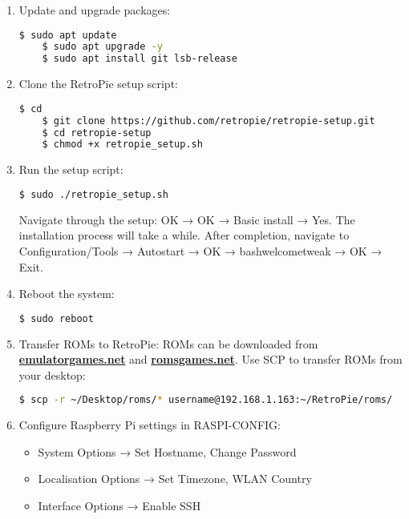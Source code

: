 \documentclass[a4paper,12pt]{article}
\begin{document}
\begin{enumerate}
    \item Update and upgrade packages:
    \begin{lstlisting}[language=bash, breaklines=true, breakatwhitespace=true, columns=fullflexible]
    $ sudo apt update
    $ sudo apt upgrade -y
    $ sudo apt install git lsb-release
    \end{lstlisting}

   \item Clone the RetroPie setup script:
    \begin{lstlisting}[language=bash, breaklines=true, breakatwhitespace=true, columns=fullflexible]
    $ cd
    $ git clone https://github.com/retropie/retropie-setup.git
    $ cd retropie-setup
    $ chmod +x retropie_setup.sh
    \end{lstlisting}

    \item Run the setup script:
    \begin{lstlisting}[language=bash, breaklines=true, breakatwhitespace=true, columns=fullflexible]
    $ sudo ./retropie_setup.sh
    \end{lstlisting}
    Navigate through the setup: OK → OK → Basic install → Yes. The installation process will take a while. After completion, navigate to Configuration/Tools → Autostart → OK → bashwelcometweak → OK → Exit.

    \item Reboot the system:
    \begin{lstlisting}[language=bash, breaklines=true, breakatwhitespace=true, columns=fullflexible]
    $ sudo reboot
    \end{lstlisting}

    \item Transfer ROMs to RetroPie:
    ROMs can be downloaded from \href{https://www.emulatorgames.net}{\textbf{\color{blue}emulatorgames.net}} and \href{https://www.romsgames.net}{\textbf{\color{blue}romsgames.net}}. Use SCP to transfer ROMs from your desktop:
    \begin{lstlisting}[language=bash, breaklines=true, breakatwhitespace=true, columns=fullflexible]
    $ scp -r ~/Desktop/roms/* username@192.168.1.163:~/RetroPie/roms/
    \end{lstlisting}

    \item Configure Raspberry Pi settings in RASPI-CONFIG:
    \begin{itemize}
        \item System Options → Set Hostname, Change Password
        \item Localisation Options → Set Timezone, WLAN Country
        \item Interface Options → Enable SSH
    \end{itemize}


\end{enumerate}
\end{document}
